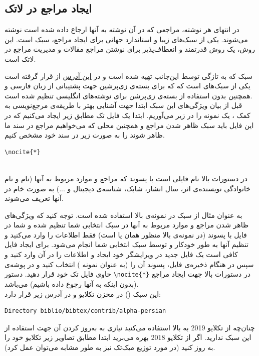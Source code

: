 \documentclass{article}
\begin{document}
\subsection{ایجاد مراجع در لاتک}	
در انتهای هر نوشته، مراجعی که در آن نوشته به آنها ارجاع داده شده
است نوشته می‌شوند. یکی از سبک‌های زیبا و استاندارد جهانی برای
ایجاد مراجع، سبک
است. این روش، یک
روش‌ قدرتمند و انعطاف‌پذیر برای نوشتن مراجع مقالات و 
مدیریت مراجع در لاتک است.
	
سبک
که به تازگی توسط این‌جانب تهیه شده است و در 
\href{https://ctan.org/tex-archive/biblio/bibtex/contrib/alpha-persian}{این آدرس}
از 
قرار گرفته است یکی از سبک‌های
است که 
که برای بسته‌ی زی‌پرشین جهت پشتیبانی از زبان فارسی و همچنین
بدون استفاده از بسته‌ی زی‌پرشن برای نوشته‌های انگلیسی 
 تنظیم شده‌ است. 
\\
قبل از بیان ویژگی‌های این سبک ابتدا جهت آشنایی بهتر با طریقه‌ی
مرجع‌نویسی به کمک 
،
یک نمونه را در زیر می‌آوریم.
ابتدا یک فایل تک مطابق زیر ایجاد می‌کنیم که در این فایل باید
سبک ظاهر شدن مراجع و همچنین محلی که می‌خواهیم مراجع در
سند ما ظاهر شوند را به صورت زیر در سند خود مشخص کنیم.
\begin{latin}
\begin{Verbatim}[fontsize=\bf,baselinestretch=1,firstnumber=1,formatcom=\color{red!50!black}]
\nocite{*}


\end{Verbatim}
\end{latin}
در دستورات بالا 
نام فایلی است با پسوند
که مراجع و موارد مربوط به آنها (نام و نام خانوادگی نویسنده‌ی اثر، 
سال انشار، شابک، شناسه‌ی دیجیتال و ...)
به صورت خام در آنها تعریف می‌شوند.

به عنوان مثال از سبک
در نمونه‌ی بالا استفاده شده است.
توجه کنید که ویژگی‌های ظاهر شدن مراجع و موارد مربوط به آنها در
سبک انتخابی شما تنظیم شده و شما در فایل با پسوند
(در نمونه‌ی بالا منظور همان
یا
است)
فقط اطلاعات را وارد می‌کنید و تنظیم آنها به طور خودکار و توسط سبک انتخابی شما انجام می‌شود. برای ایجاد فایل 
کافی است یک فایل جدید در ویرایشگر خود ایجاد و اطلاعات را در 
آن وارد کنید و سپس در هنگام ذخیره‌ی فایل، پسوند آن را 
(به عنوان نمونه  )
انتخاب کنید و در پوشه‌ی حاوی فایل تک خود قرار دهید. 
دستور
\verb|\nocite{*}|
در دستورات بالا جهت ایجاد مراجع (بدون اینکه به آنها رجوع داده
باشیم) می‌باشد.
\\
این سبک () در مخزن تکلایو و در آدرس زیر قرار دارد:
\begin{latin}
\begin{Verbatim}[fontsize=\bf,baselinestretch=1,firstnumber=1,formatcom=\color{red!50!black}]
Direc­tory biblio/bibtex/contrib/alpha-persian
\end{Verbatim}
\end{latin}
چنان‌چه از تکلایو
2019
به بالا استفاده می‌کنید نیازی به به‌روز کردن آن جهت استفاده از این سبک ندارید. اگر از تکلایو
2018
بهره می‌برید ابتدا مطابق تصاویر زیر تکلایو خود را به روز کنید (در 
مورد توزیع میک‌تک نیز به طور مشابه می‌توان عمل کرد).
\end{document}
